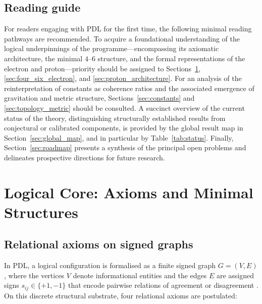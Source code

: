 \documentclass{article}
\begin{document}
\subsection*{Reading guide}

For readers engaging with PDL for the first time, the following minimal reading pathways are recommended. To acquire a foundational understanding of the logical underpinnings of the programme—encompassing its axiomatic architecture, the minimal $4$–$6$ structure, and the formal representations of the electron and proton—priority should be assigned to Sections~\ref{sec:logical_core}, \ref{sec:four_six_electron}, and \ref{sec:proton_architecture}. For an analysis of the reinterpretation of constants as coherence ratios and the associated emergence of gravitation and metric structure, Sections~\ref{sec:constants} and \ref{sec:topology_metric} should be consulted. A succinct overview of the current status of the theory, distinguishing structurally established results from conjectural or calibrated components, is provided by the global result map in Section~\ref{sec:global_map}, and in particular by Table~\ref{tab:status}. Finally, Section~\ref{sec:roadmap} presents a synthesis of the principal open problems and delineates prospective directions for future research.

\section{Logical Core: Axioms and Minimal Structures}
\label{sec:logical_core}

\subsection{Relational axioms on signed graphs}
\label{subsec:axioms}

In PDL, a logical configuration is formalised as a finite signed graph \(G = (V, E)\), where the vertices \(V\) denote informational entities and the edges \(E\) are assigned signs \(s_{ij} \in \{+1, -1\}\) that encode pairwise relations of agreement or disagreement \citep{PDL_Main_2026,PDL_intro}. On this discrete structural substrate, four relational axioms are postulated:
\end{document}
